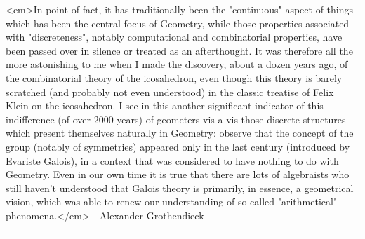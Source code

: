 <em>In point of fact, it has traditionally been the 
"continuous" aspect of 
things which has been the central focus of Geometry, while those properties 
associated with "discreteness", notably computational and 
combinatorial 
properties, have been passed over in silence or treated as an afterthought. 
It was therefore all the more astonishing to me when I made the discovery, 
about a dozen years ago, of the combinatorial theory of the icosahedron, 
even though this theory is barely scratched (and probably not even understood) 
in the classic treatise of Felix Klein on the icosahedron.  I see in this 
another significant indicator of this indifference (of over 2000 years) 
of geometers vis-a-vis those discrete structures which present themselves 
naturally in Geometry: observe that the concept of the group (notably of 
symmetries) appeared only in the last century (introduced by Evariste 
Galois), in a context that was considered to have nothing to do with 
Geometry.  Even in our own time it is true that there are lots of 
algebraists who still haven't understood that Galois theory is primarily, 
in essence, a geometrical vision, which was able to renew our understanding 
of so-called "arithmetical" phenomena.</em> - Alexander Grothendieck

\par\noindent\rule{\textwidth}{0.4pt}

